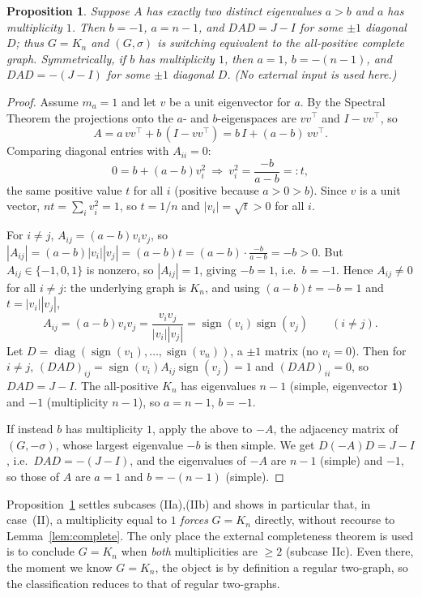 \documentclass{amsart}
\newtheorem{proposition}{Proposition}
\theoremstyle{definition}
\begin{document}
\begin{proposition}\label{prop:simple}
Suppose $A$ has exactly two distinct eigenvalues $a>b$ and $a$ has
multiplicity $1$. Then $b=-1$, $a=n-1$, and $DAD=J-I$ for some $\pm1$ diagonal
$D$; thus $G=K_n$ and $(G,\sigma)$ is switching equivalent to the all-positive
complete graph. Symmetrically, if $b$ has multiplicity $1$, then $a=1$,
$b=-(n-1)$, and $DAD=-(J-I)$ for some $\pm1$ diagonal $D$. (No external input
is used here.)
\end{proposition}

\begin{proof}
Assume $m_a=1$ and let $v$ be a unit eigenvector for $a$. By the Spectral
Theorem the projections onto the $a$- and $b$-eigenspaces are $vv^\top$ and
$I-vv^\top$, so
\[
A=a\,vv^\top+b\,(I-vv^\top)=b\,I+(a-b)\,vv^\top .
\]
Comparing diagonal entries with $A_{ii}=0$:
\[
0=b+(a-b)v_i^2\ \Longrightarrow\ v_i^2=\frac{-b}{a-b}=:t,
\]
the same positive value $t$ for all $i$ (positive because $a>0>b$). Since $v$
is a unit vector, $nt=\sum_i v_i^2=1$, so $t=1/n$ and $|v_i|=\sqrt t>0$ for all
$i$.

For $i\ne j$, $A_{ij}=(a-b)v_iv_j$, so
$|A_{ij}|=(a-b)|v_i||v_j|=(a-b)t=(a-b)\cdot\frac{-b}{a-b}=-b>0$. But
$A_{ij}\in\{-1,0,1\}$ is nonzero, so $|A_{ij}|=1$, giving $-b=1$, i.e.\ $b=-1$.
Hence $A_{ij}\ne0$ for all $i\ne j$: the underlying graph is $K_n$, and using
$(a-b)t=-b=1$ and $t=|v_i||v_j|$,
\[
A_{ij}=(a-b)v_iv_j=\frac{v_iv_j}{|v_i||v_j|}
=\operatorname{sign}(v_i)\operatorname{sign}(v_j)\qquad(i\ne j).
\]
Let $D=\operatorname{diag}(\operatorname{sign}(v_1),\dots,
\operatorname{sign}(v_n))$, a $\pm1$ matrix (no $v_i=0$). Then for $i\ne j$,
$(DAD)_{ij}=\operatorname{sign}(v_i)A_{ij}\operatorname{sign}(v_j)=1$ and
$(DAD)_{ii}=0$, so $DAD=J-I$. The all-positive $K_n$ has eigenvalues $n-1$
(simple, eigenvector $\mathbf 1$) and $-1$ (multiplicity $n-1$), so $a=n-1$,
$b=-1$.

If instead $b$ has multiplicity $1$, apply the above to $-A$, the adjacency
matrix of $(G,-\sigma)$, whose largest eigenvalue $-b$ is then simple. We get
$D(-A)D=J-I$, i.e.\ $DAD=-(J-I)$, and the eigenvalues of $-A$ are $n-1$
(simple) and $-1$, so those of $A$ are $a=1$ and $b=-(n-1)$ (simple).
\end{proof}

Proposition~\ref{prop:simple} settles subcases (IIa),(IIb) and shows in
particular that, in case~(II), a multiplicity equal to $1$ \emph{forces}
$G=K_n$ directly, without recourse to Lemma~\ref{lem:complete}. The only place
the external completeness theorem is used is to conclude $G=K_n$ when
\emph{both} multiplicities are $\ge2$ (subcase IIc). Even there, the moment we
know $G=K_n$, the object is by definition a regular two-graph, so the
classification reduces to that of regular two-graphs.
\end{document}
